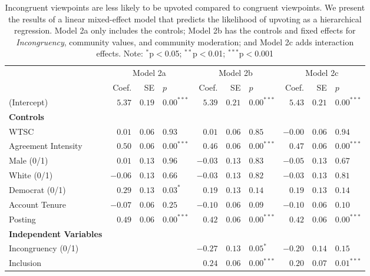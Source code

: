 \begin{table*}[t!]
    \footnotesize
    \centering
    \caption{Incongruent viewpoints are less likely to be upvoted compared to congruent viewpoints. We present the results of a linear mixed-effect model that predicts the likelihood of upvoting as a hierarchical regression. Model 2a only includes the controls; Model 2b has the controls and fixed effects for \textit{Incongruency}, community values, and community moderation; and Model 2c adds interaction effects. Note: $^{*}$p$<$0.05; $^{**}$p$<$0.01; $^{***}$p$<$0.001}
    \begin{tabular}{lrrlrrlrrl}
    \toprule
         & \multicolumn{3}{c}{Model 2a} &  \multicolumn{3}{c}{Model 2b} &  \multicolumn{3}{c}{Model 2c}\\
        \cmidrule(lr){2-4}\cmidrule(lr){5-7}\cmidrule(lr){8-10}
     & Coef. & SE & $p$ & Coef. & SE & $p$ & Coef. & SE & $p$\\ \midrule
    (Intercept) & $5.37$ & $0.19$ & $0.00^{***}$ & $5.39$ & $0.21$ & $0.00^{***}$ & $5.43$ & $0.21$ & $0.00^{***}$\\ 
    \textbf{Controls} \\
    WTSC & $0.01$ & $0.06$ & $0.93$ &$0.01$ &$0.06$ &$0.85$ &$-0.00$ & $0.06$ & $0.94$\\ 
    Agreement Intensity & $0.50$ & $0.06$ & $0.00^{***}$ & $0.46$ & $0.06$ & $0.00^{***}$ & $0.47$ & $0.06$ & $0.00^{***}$\\
    Male (0/1) & $0.01$ & $0.13$ & $0.96$ & $-0.03$ & $0.13$ & $0.83$ & $-0.05$ & $0.13$ & $0.67$\\
    White (0/1) & $-0.06$ & $0.13$ &$0.66$ & $-0.03$ & $0.13$ & $0.82$ & $-0.03$ & $0.13$ & $0.81$\\ 
    Democrat (0/1) & $0.29$ & $0.13$ &$0.03^{*}$ & $0.19$ & $0.13$ & $0.14$ & $0.19$ & $0.13$ & $0.14$\\
    Account Tenure & $-0.07$ & $0.06$ & $0.25$ & $-0.10$ & $0.06$ & $0.09$ & $-0.10$ & $0.06$ & $0.10$\\
    Posting & $0.49$ & $0.06$ & $0.00^{***}$& $0.42$ & $0.06$ & $0.00^{***}$ & $0.42$ & $0.06$ & $0.00^{***}$\\ \addlinespace
    \textbf{Independent Variables} \\
    Incongruency (0/1) & & & & $-0.27$ & $0.13$ & $0.05^{*}$ & $-0.20$ & $0.14$& $0.15$\\
    Inclusion & & & & $0.24$ & $0.06$ & $0.00^{***}$ & $0.20$ & $0.07$ & $0.01^{***}$\\

\end{tabular}
\end{table*}
